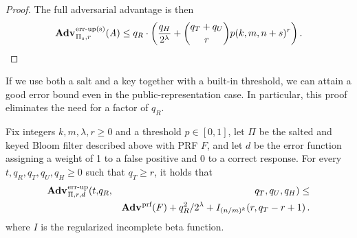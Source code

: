 \begin{proof}
The full adversarial advantage is then
$$\Adv{\erreps}_{\struct_s,r}(\advA) \le q_R \cdot \left(\frac{q_H}{2^\lambda} + \binom{q_T+q_U}{r}p(k, m, n+s)^r\right).$$

\end{proof}

If we use both a salt and a key together with a built-in threshold, we can attain a good error bound even in the public-representation case. In particular, this proof eliminates the need for a factor of $q_R$.

\begin{theorem}\label{thm:bf-key-bound}
Fix integers $k, m, \lambda, r\geq 0$ and a threshold $p \in [0,1]$, let $\Pi$ be the salted and keyed Bloom filter described above with PRF $F$, and let $d$ be the error function assigning a weight of 1 to a false positive and 0 to a correct response.
  For every $t, q_R, q_T, q_U, q_H \geq 0$ such that $q_T \geq r$, it holds that
  \begin{eqnarray*}
    \Adv{\errep}_{\struct,r,d}(t,&q_R,& q_T, q_U, q_H) \leq \\ && \Adv{\prf}(F) + q_R^2/2^\lambda + I_{(n/m)^k}(r, q_T-r+1) \,.
  \end{eqnarray*}
where $I$ is the regularized incomplete beta function.
\end{theorem}

